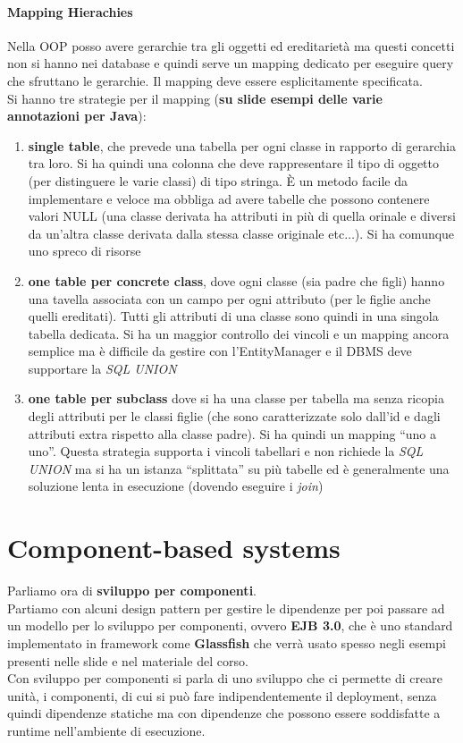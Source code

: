 \documentclass[a4paper,12pt, oneside]{book}
\begin{document}
\subsubsection{Mapping Hierachies}
Nella OOP posso avere gerarchie tra gli oggetti ed ereditarietà ma questi
concetti non si hanno nei database e quindi serve un mapping dedicato per
eseguire query che sfruttano le gerarchie. Il mapping deve essere esplicitamente
specificata.\\
Si hanno tre strategie per il mapping (\textbf{su slide esempi delle varie
  annotazioni per Java}):
\begin{enumerate}
  \item \textbf{single table}, che prevede una tabella per ogni classe in
  rapporto di gerarchia tra loro. Si ha quindi una colonna che deve
  rappresentare il tipo di oggetto (per distinguere le varie classi) di tipo
  stringa. È un metodo facile da implementare e veloce ma obbliga ad avere
  tabelle che possono contenere valori NULL (una classe derivata ha attributi in
  più di quella orinale e diversi da un'altra classe derivata dalla stessa
  classe originale etc$\ldots$). Si ha comunque uno spreco di risorse
  \item \textbf{one table per concrete class}, dove ogni classe (sia padre che
  figli) hanno una tavella associata con un campo per ogni attributo (per le
  figlie anche quelli ereditati). Tutti gli attributi di una classe sono quindi
  in una singola tabella dedicata. Si ha un maggior controllo dei vincoli e un
  mapping ancora semplice ma è difficile da gestire con l'EntityManager e il
  DBMS deve supportare la \textit{SQL UNION}
  \item \textbf{one table per subclass} dove si ha una classe per tabella ma
  senza ricopia degli attributi per le classi figlie (che sono caratterizzate
  solo dall'id e dagli attributi extra rispetto alla classe padre). Si ha quindi
  un mapping ``uno a uno''. Questa
  strategia supporta i vincoli tabellari e non richiede la \textit{SQL UNION} ma
  si ha un istanza ``splittata'' su più tabelle ed è generalmente una soluzione
  lenta in esecuzione (dovendo eseguire i \textit{join})
\end{enumerate}
\chapter{Component-based systems}
Parliamo ora di \textbf{sviluppo per componenti}.\\
Partiamo con alcuni design pattern per gestire le dipendenze per poi passare ad
un modello per lo sviluppo per componenti, ovvero \textbf{EJB 
3.0}, che è uno standard implementato in framework come \textbf{Glassfish} che
verrà usato spesso negli esempi presenti nelle slide e nel materiale del
corso.\\
Con sviluppo per componenti si parla di uno sviluppo che ci permette di creare
unità, i componenti, di cui si può fare indipendentemente il deployment, senza
quindi dipendenze statiche ma con dipendenze che possono essere soddisfatte a
runtime nell'ambiente di esecuzione.
\end{document}
